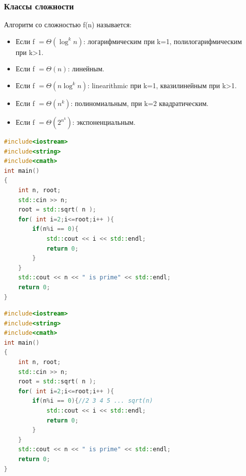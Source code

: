 \documentclass[russian, 12pt]{beamer}
\begin{document}
\begin{frame}
\frametitle{Классы сложности}
Алгоритм со сложностью f(n) называется:
\begin{itemize}
  \item Если f $=\Theta(\log^kn)$: 
  логарифмическим при k=1, полилогарифмическим при k>1.\\[0.3cm]

  \item Если f $=\Theta(n)$: 
  линейным.\\[0.3cm]

  \item Если f $=\Theta(n\log^kn)$: 
  linearithmic при k=1, квазилинейным при k>1.\\[0.3cm]
  
  \item Если f $=\Theta(n^k)$: 
  полиномиальным, при k=2 квадратическим. \\[0.3cm]
  
  \item Если f $=\Theta(2^{n^k})$: 
  экспоненциальным. \\

\end{itemize}
\end{frame}
\lstset{style=mystyle}
\begin{frame}[fragile]
%
\begin{lstlisting}[language=C++]
#include<iostream> 
#include<string>
#include<cmath>
int main()
{
    int n, root;
    std::cin >> n;
    root = std::sqrt( n );
    for( int i=2;i<=root;i++ ){
        if(n%i == 0){
            std::cout << i << std::endl;
            return 0;
        }
    }
    std::cout << n << " is prime" << std::endl;
    return 0;
}  
\end{lstlisting}
\end{frame}
\lstset{style=mystyle}
\begin{frame}[fragile]
%
\begin{lstlisting}[language=C++]
#include<iostream> 
#include<string>
#include<cmath>
int main()
{
    int n, root;
    std::cin >> n;
    root = std::sqrt( n );
    for( int i=2;i<=root;i++ ){
        if(n%i == 0){//2 3 4 5 ... sqrt(n)
            std::cout << i << std::endl;
            return 0;
        }
    }
    std::cout << n << " is prime" << std::endl;
    return 0;
}  
\end{lstlisting}
\end{frame}
\end{document}
